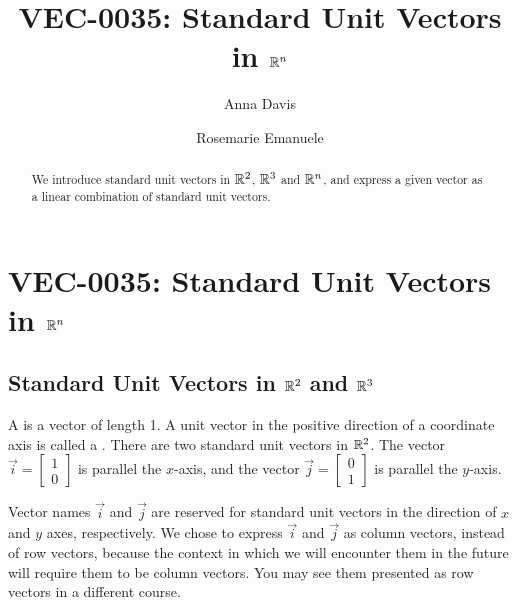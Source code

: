 \documentclass{ximera}
\author{Anna Davis \and Rosemarie Emanuele} \title{VEC-0035:  Standard Unit Vectors in $\mathbb{R}^n$} \license{CC-BY 4.0}
\begin{document}
\begin{abstract}
 We introduce standard unit vectors in $\mathbb{R}^2$, $\mathbb{R}^3$ and $\mathbb{R}^n$, and express a given vector as a linear combination of standard unit vectors. 
\end{abstract}
\maketitle

\section*{VEC-0035:  Standard Unit Vectors in $\mathbb{R}^n$}

\subsection*{Standard Unit Vectors in $\mathbb{R}^2$ and $\mathbb{R}^3$} 
A  is a vector of length 1.  A unit vector in the positive direction of a coordinate axis is called a .  There are two standard unit vectors in $\mathbb{R}^2$.  The vector $\vec{i}=\begin{bmatrix}
1\\
0
\end{bmatrix}$ is parallel the $x$-axis, and the vector $\vec{j}=\begin{bmatrix}
0\\
1
\end{bmatrix}$ is parallel the $y$-axis.  

\begin{center}
\end{center}

Vector names $\vec{i}$ and $\vec{j}$ are reserved for standard unit vectors in the direction of $x$ and $y$ axes, respectively.  We chose to express $\vec{i}$ and $\vec{j}$ as column vectors, instead of row vectors, because the context in which we will encounter them in the future will require them to be column vectors.  You may see them presented as row vectors in a different course.
\end{document}

